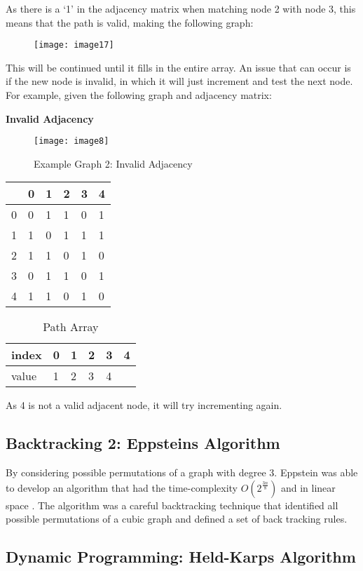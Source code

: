 As there is a ‘1’ in the adjacency matrix when matching node 2 with node 3, this
means that the path is valid, making the following graph:

\begin{figure}[H]
    \centering
    \texttt{[image: image17]}
\end{figure}

This will be continued until it fills in the entire array. An issue that can
occur is if the new node is invalid, in which it will just increment and test
the next node. For example, given the following graph and adjacency matrix:

\textbf{Invalid Adjacency}

\begin{figure}[H]
    \centering
    \texttt{[image: image8]}
    \caption{Example Graph 2: Invalid Adjacency}
\end{figure}

\begin{table}[H]
    \centering
    \begin{tabular}{l | lllll}
          & 0 & 1 & 2 & 3 & 4  \\
        \hline
        0 & 0 & 1 & 1 & 0 & 1  \\
        1 & 1 & 0 & 1 & 1 & 1  \\
        2 & 1 & 1 & 0 & 1 & 0  \\
        3 & 0 & 1 & 1 & {\cellcolor[rgb]{0.933,0.804,0.804}}0 & 1  \\
        4 & 1 & 1 & 0 & 1 & 0 
    \end{tabular}
\end{table}


\begin{table}[H]
    \centering
    \caption{Path Array}
    \begin{tabular}{l | lllll}
        index & 0 & 1 & 2 & 3 & 4  \\
        \hline
        value & 1 & 2 & 3 & {\cellcolor[rgb]{0.933,0.804,0.804}}4 &  \\
    \end{tabular}
\end{table}

As 4 is not a valid adjacent node, it will try incrementing again.

\subsection{Backtracking 2: Eppsteins Algorithm}

By considering possible permutations of a graph with degree 3. Eppstein was able
to develop an algorithm that had the time-complexity $O(2^{\frac{3n}{8}})$ and
in linear space \cite{Epps2007}. The algorithm was a careful backtracking
technique that identified all possible permutations of a cubic graph and defined
a set of back tracking rules.

\subsection{Dynamic Programming: Held-Karps Algorithm}

